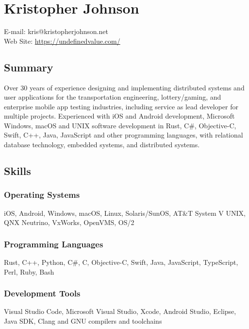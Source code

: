 \section{Kristopher Johnson}\label{kristopher-johnson}

E-mail: kris@kristopherjohnson.net\\
Web Site: \url{https://undefinedvalue.com/}

\subsection{Summary}\label{summary}

Over 30 years of experience designing and implementing distributed
systems and user applications for the transportation engineering,
lottery/gaming, and enterprise mobile app testing industries, including
service as lead developer for multiple projects. Experienced with iOS
and Android development, Microsoft Windows, macOS and UNIX software
development in Rust, C\#, Objective-C, Swift, C++, Java, JavaScript and
other programming languages, with relational database technology,
embedded systems, and distributed systems.

\subsection{Skills}\label{skills}

\subsubsection{Operating Systems}\label{operating-systems}

iOS, Android, Windows, macOS, Linux, Solaris/SunOS, AT\&T System V UNIX,
QNX Neutrino, VxWorks, OpenVMS, OS/2

\subsubsection{Programming Languages}\label{programming-languages}

Rust, C++, Python, C\#, C, Objective-C, Swift, Java, JavaScript,
TypeScript, Perl, Ruby, Bash

\subsubsection{Development Tools}\label{development-tools}

Visual Studio Code, Microsoft Visual Studio, Xcode, Android Studio,
Eclipse, Java SDK, Clang and GNU compilers and toolchains

